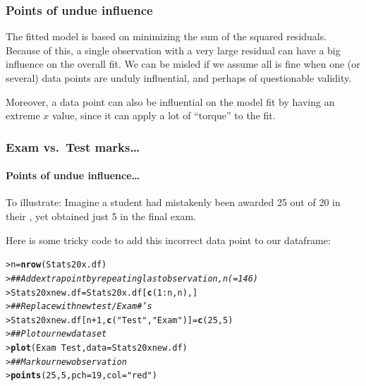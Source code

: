 \documentclass{beamer}\usepackage[]{graphicx}\usepackage[]{xcolor}
\makeatletter
\newcommand{\hlnum}[1]{\textcolor[rgb]{0.686,0.059,0.569}{#1}}%
\newcommand{\hlstr}[1]{\textcolor[rgb]{0.192,0.494,0.8}{#1}}%
\newcommand{\hlcom}[1]{\textcolor[rgb]{0.678,0.584,0.686}{\textit{#1}}}%
\newcommand{\hlopt}[1]{\textcolor[rgb]{0,0,0}{#1}}%
\newcommand{\hlstd}[1]{\textcolor[rgb]{0.345,0.345,0.345}{#1}}%
\newcommand{\hlkwb}[1]{\textcolor[rgb]{0.69,0.353,0.396}{#1}}%
\newcommand{\hlkwc}[1]{\textcolor[rgb]{0.333,0.667,0.333}{#1}}%
\newcommand{\hlkwd}[1]{\textcolor[rgb]{0.737,0.353,0.396}{\textbf{#1}}}%
\newenvironment{kframe}{%
 \def\at@end@of@kframe{}%
 \ifinner\ifhmode%
  \def\at@end@of@kframe{\end{minipage}}%
  \begin{minipage}{\columnwidth}%
 \fi\fi%
 \def\FrameCommand##1{\hskip\@totalleftmargin \hskip-\fboxsep
 \colorbox{shadecolor}{##1}\hskip-\fboxsep
     \hskip-\linewidth \hskip-\@totalleftmargin \hskip\columnwidth}%
 \MakeFramed {\advance\hsize-\width
   \@totalleftmargin\z@ \linewidth\hsize
   \@setminipage}}%
 {\par\unskip\endMakeFramed%
 \at@end@of@kframe}
\newenvironment{knitrout}{}{} %
\makeatother
\begin{document}
\begin{frame}[fragile]
\frametitle{Points of undue influence}


The fitted model is based on minimizing the sum of the squared residuals. Because of this, a single observation with a very large residual can have a big influence on the overall fit.
We can be misled if we assume all is fine when one (or several) data points are unduly influential, and perhaps of questionable validity.
\bigskip

Moreover, a data point can also be influential on the model fit by having an extreme $x$ value, since it can apply a lot of ``torque'' to the fit.

\end{frame}


\begin{frame}[fragile]
\frametitle{Exam vs.\ Test marks\ldots}
\framesubtitle{Points of undue influence\ldots}
To illustrate: Imagine a student had mistakenly been awarded 25 out of 20 in their , yet obtained just 5 in the final exam.
\bigskip

Here is some tricky  code to add this incorrect data point to our dataframe:
\begin{knitrout}\scriptsize
{}\color{fgcolor}\begin{kframe}
\begin{alltt}
\hlstd{> }\hlstd{n}\hlkwb{=}\hlkwd{nrow}\hlstd{(Stats20x.df)}
\hlstd{> }\hlcom{## Add extra point by repeating last observation, n(=146)}
\hlstd{> }\hlstd{Stats20xnew.df}\hlkwb{=}\hlstd{Stats20x.df[}\hlkwd{c}\hlstd{(}\hlnum{1}\hlopt{:}\hlstd{n,n),]}
\hlstd{> }\hlcom{## Replace with new test /Exam #'s}
\hlstd{> }\hlstd{Stats20xnew.df[n}\hlopt{+}\hlnum{1}\hlstd{,}\hlkwd{c}\hlstd{(}\hlstr{"Test"}\hlstd{,} \hlstr{"Exam"}\hlstd{)]}\hlkwb{=}\hlkwd{c}\hlstd{(}\hlnum{25}\hlstd{,}\hlnum{5}\hlstd{)}
\hlstd{> }\hlcom{## Plot our new dataset}
\hlstd{> }\hlkwd{plot}\hlstd{(Exam}\hlopt{~} \hlstd{Test,} \hlkwc{data}\hlstd{=Stats20xnew.df)}
\hlstd{> }\hlcom{## Mark our new observation}
\hlstd{> }\hlkwd{points}\hlstd{(}\hlnum{25}\hlstd{,}\hlnum{5}\hlstd{,}\hlkwc{pch}\hlstd{=}\hlnum{19}\hlstd{,}\hlkwc{col}\hlstd{=}\hlstr{"red"}\hlstd{)}
\end{alltt}
\end{kframe}
\end{knitrout}
\end{frame}
\end{document}
